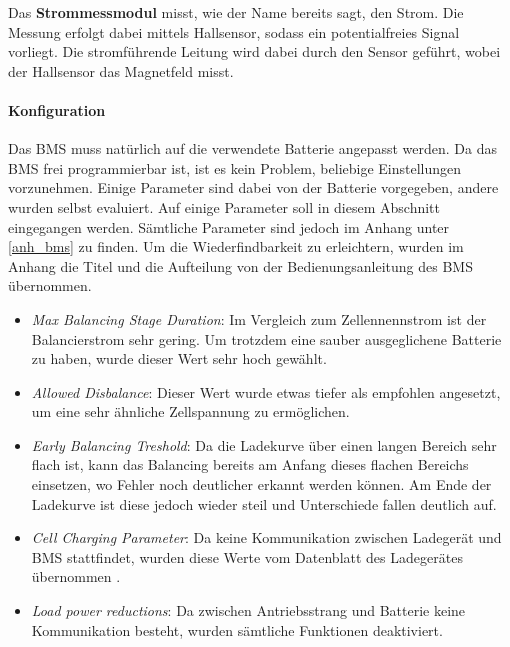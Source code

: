Das \textbf{Strommessmodul} misst, wie der Name bereits sagt, den Strom. Die Messung erfolgt dabei mittels Hallsensor, sodass ein potentialfreies Signal vorliegt. Die stromführende Leitung wird dabei durch den Sensor geführt, wobei der Hallsensor das Magnetfeld misst.

\paragraph{Konfiguration}
Das BMS muss natürlich auf die verwendete Batterie angepasst werden. Da das BMS frei programmierbar ist, ist es kein Problem, beliebige Einstellungen vorzunehmen. Einige Parameter sind dabei von der Batterie vorgegeben, andere wurden selbst evaluiert. Auf einige Parameter soll in diesem Abschnitt eingegangen werden. Sämtliche Parameter sind jedoch im Anhang unter \ref{anh_bms} zu finden. Um die Wiederfindbarkeit zu erleichtern, wurden im Anhang die Titel und die Aufteilung von der Bedienungsanleitung des BMS \cite{bms} übernommen. \begin{itemize}
	\item \textit{Max Balancing Stage Duration}: Im Vergleich zum Zellennennstrom ist der Balancierstrom sehr gering. Um trotzdem eine sauber ausgeglichene Batterie zu haben, wurde dieser Wert sehr hoch gewählt.
	\item \textit{Allowed Disbalance}: Dieser Wert wurde etwas tiefer als empfohlen angesetzt, um eine sehr ähnliche Zellspannung zu ermöglichen.
	\item \textit{Early Balancing Treshold}: Da die Ladekurve über einen langen Bereich sehr flach ist, kann das Balancing bereits am Anfang dieses flachen Bereichs einsetzen, wo Fehler noch deutlicher erkannt werden können. Am Ende der Ladekurve ist diese jedoch wieder steil und Unterschiede fallen deutlich auf.
	\item \textit{Cell Charging Parameter}: Da keine Kommunikation zwischen Ladegerät und BMS stattfindet, wurden diese Werte vom Datenblatt des Ladegerätes übernommen \cite{ladegeraet}.
	\item \textit{Load power reductions}: Da zwischen Antriebsstrang und Batterie keine Kommunikation besteht, wurden sämtliche Funktionen deaktiviert.
\end{itemize}